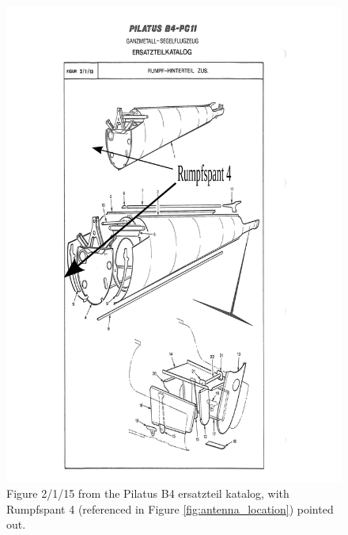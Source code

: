 \documentclass{article}
\begin{document}
\begin{figure}
\includegraphics[width=\textwidth,keepaspectratio]{b4_ersatzteil_katalog_fig_2_1_15_annotated}
\caption{Figure 2/1/15 from the Pilatus B4 ersatzteil katalog, with Rumpfspant 4 (referenced in Figure \ref{fig:antenna_location}) pointed out.}
\label{fig:ersatzteil_rumpfspant4}
\end{figure}
\end{document}
